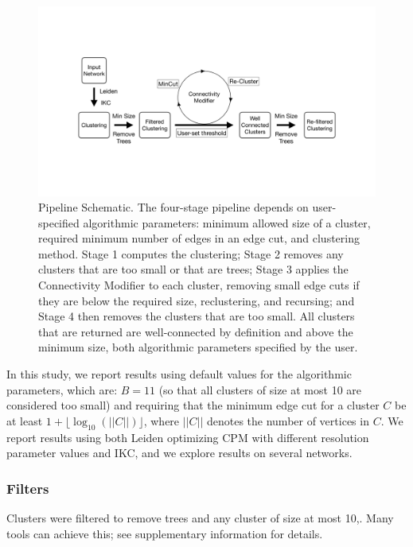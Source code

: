 \documentclass[11pt]{article}   	%
\begin{document}
\begin{figure}[H]
\centering
\includegraphics[width=0.8\linewidth]{figs/workflow.pdf}
\caption{Pipeline Schematic. The four-stage pipeline depends on user-specified algorithmic parameters: minimum allowed size of a cluster, required minimum number of edges in an edge cut, and clustering method.  Stage 1 computes the clustering; Stage 2 removes any clusters that are too small or that are trees;  Stage 3 applies the  Connectivity Modifier to each cluster, removing small edge cuts if they are below the required size, reclustering, and recursing;  and Stage 4 then removes the clusters that are too small. All clusters that are returned are well-connected by definition and above the minimum size, both algorithmic parameters specified by the user.}
\end{figure}




In this study, we report results using default values for the algorithmic parameters, which are: $B=11$ (so that all clusters of size at most 10 are considered too small) and requiring that the minimum edge cut for a cluster $C$ be at least  $ 1+ \lfloor \log_{10}(||C||) \rfloor$,  where $||C||$ denotes the number of vertices in $C$.
We report results using both Leiden optimizing CPM with different resolution parameter values and IKC, and we explore results on several networks.


\subsubsection{Filters} Clusters were filtered to remove trees and any cluster of size at most 10,. Many tools can achieve this; see supplementary information for details.
\end{document}
